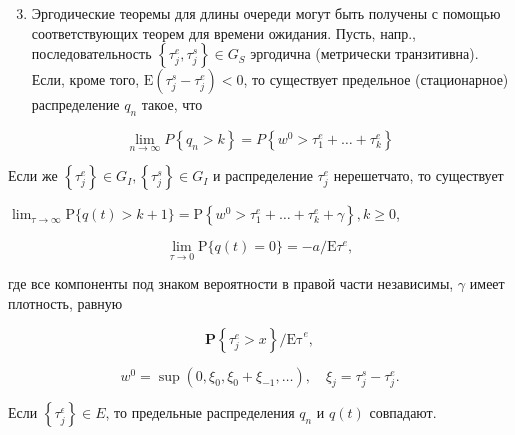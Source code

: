 \documentclass[10pt]{article}
\begin{document}
\begin{enumerate}

  \setcounter{enumi}{2}

  \item Эргодические теоремы для длины очереди могут быть получены с помощью соответствующих теорем для времени ожидания. Пусть, напр., последовательность $\left\{\tau_{j}^{e}, \tau_{j}^{s}\right\} \in G_{S}$ эргодична (метрически транзитивна). Если, кроме того, $\mathrm{E}\left(\tau_{j}^{s}-\tau_{j}^{e}\right)<0$, то существует предельное (стационарное) распределение $q_{n}$ такое, что

\end{enumerate}



\[

\lim _{n \rightarrow \infty} P\left\{q_{n}>k\right\}=P\left\{w^{0}>\tau_{1}^{e}+\ldots+\tau_{k}^{e}\right\}

\]



Если же $\left\{\tau_{j}^{e}\right\} \in G_{I},\left\{\tau_{j}^{s}\right\} \in G_{I}$ и распределение $\tau_{j}^{e}$ нерешетчато, то существует



$\lim _{\tau \rightarrow \infty} \mathrm{P}\{q(t)>k+1\}=\mathrm{P}\left\{w^{0}>\tau_{1}^{e}+\ldots+\tau_{k}^{e}+\gamma\right\}, k \geqslant 0$,



\[

\lim _{\tau \rightarrow 0} \mathrm{P}\{q(t)=0\}=-a / \mathrm{E} \tau^{e},

\]



где все компоненты под знаком вероятности в правой части независимы, $\gamma$ имеет плотность, равную



\[

\mathbf{P}\left\{\tau_{j}^{e}>x\right\} / \mathrm{E \tau}^{e},

\]



\[

w^{0}=\sup \left(0, \xi_{0}, \xi_{0}+\xi_{-1}, \ldots\right), \quad \xi_{j}=\tau_{j}^{s}-\tau_{j}^{e} .

\]



Если $\left\{\tau_{j}^{\epsilon}\right\} \in E$, то предельные распределения $q_{n}$ и $q(t)$ совпадают.
\end{document}
